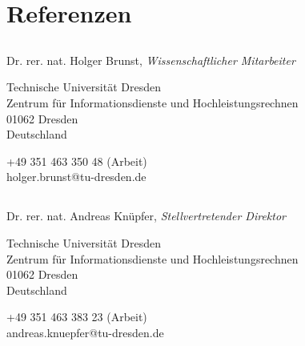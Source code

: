 

\usepackage{ngerman}



\pagestyle{empty}



\customhrule
\section*{Referenzen}

\subsection*{}

Dr. rer. nat. Holger Brunst, \emph{Wissenschaftlicher Mitarbeiter}
\vspace{0.25cm}

Technische Universit\"at Dresden \\
Zentrum f\"ur Informationsdienste und Hochleistungsrechnen \\
01062 Dresden \\
Deutschland
\vspace{0.25cm}

+49 351 463 350 48 (Arbeit) \\
holger.brunst@tu-dresden.de

\subsection*{}

Dr. rer. nat. Andreas Kn\"upfer, \emph{Stellvertretender Direktor}
\vspace{0.25cm}

Technische Universit\"at Dresden \\
Zentrum f\"ur Informationsdienste und Hochleistungsrechnen \\
01062 Dresden \\
Deutschland
\vspace{0.25cm}

+49 351 463 383 23 (Arbeit) \\
andreas.knuepfer@tu-dresden.de



